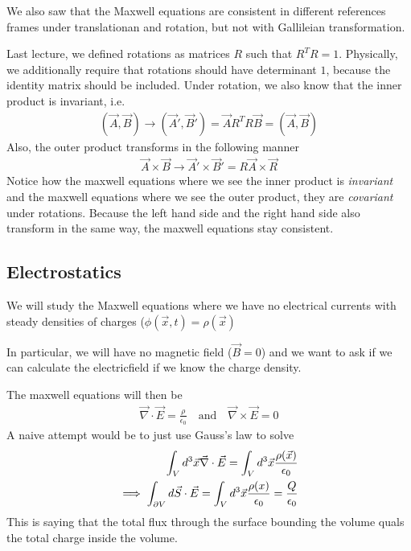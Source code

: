 
We also saw that the Maxwell equations are consistent in different references frames under translationan and rotation, but not with Gallileian transformation.

Last lecture, we defined rotations as matrices $R$ such that $R^{T}R = 1$.
Physically, we additionally require that rotations should have determinant $1$, because the identity matrix should be included.
Under rotation, we also know that the inner product is invariant, i.e.
\begin{align*}
  (\vec{A},\vec{B}) \to (\vec{A}',\vec{B}') = \vec{A}R^{T}R \vec{B} = (\vec{A},\vec{B})
\end{align*}
Also, the outer product transforms in the following manner
\begin{align*}
  \vec{A}\times \vec{B} \to  \vec{A}' \times \vec{B}' = R \vec{A} \times \vec{R} 
\end{align*}
Notice how the maxwell equations where we see the inner product is \emph{invariant} and the maxwell equations where we see the outer product, they are \emph{covariant} under rotations. Because the left hand side and the right hand side also transform in the same way, the maxwell equations stay consistent.

\subsection{Electrostatics}
We will study the Maxwell equations where we have no electrical currents with steady densities of charges ($\phi(\vec{x},t) = \rho(\vec{x})$

In particular, we will have no magnetic field ($\vec{B} = 0$) and we want to ask if we can calculate the electricfield if we know the charge density.

The maxwell equations will then be
\begin{align*}
  \vec{\nabla}\cdot \vec{E} = \frac{\rho}{\epsilon_0} \quad \text{and} \quad \vec{\nabla}\times \vec{E} = 0
\end{align*}
A naive attempt would be to just use Gauss's law to solve
\begin{align*}
  \int_V d^{3} \vec{x} \vec{\nabla} \cdot \vec{E} = \int_V d^{3} \vec{x} \frac{\rho(\vec{x})}{\epsilon_0}\\
  \implies \int_{\partial V} d \vec{S} \cdot \vec{E} = \int_{V} d^{3} \vec{x} \frac{\rho(x)}{\epsilon_0} = \frac{Q}{\epsilon_0}
\end{align*}
This is saying that the total flux through the surface bounding the volume quals the total charge inside the volume.

